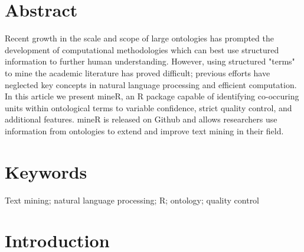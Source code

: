 \documentclass{jors}
\begin{document}
\section*{Abstract}

Recent growth in the scale and scope of large ontologies has prompted the development of computational methodologies which can best use structured information to further human understanding. However, using structured "terms" to mine the academic literature has proved difficult; previous efforts have neglected key concepts in natural language processing and efficient computation. In this article we present mineR, an R package capable of identifying co-occuring units within ontological terms to variable confidence, strict quality control, and additional features. mineR is released on Github and allows researchers use information from ontologies to extend and improve text mining in their field.


%
%


\section*{Keywords}

Text mining; natural language processing; R; ontology; quality control

\section*{Introduction}
\end{document}
